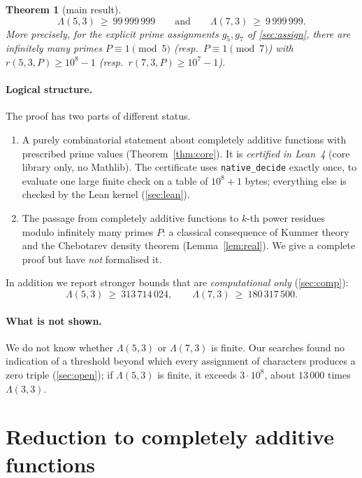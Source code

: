 \documentclass[11pt]{article}
\numberwithin{equation}{section}
\newtheorem{theorem}{Theorem}[section]
\theoremstyle{definition}
\theoremstyle{remark}
\begin{document}
\begin{theorem}[main result]\label{thm:main}
\[
  \Lambda(5,3)\ \ge\ 99\,999\,999 \qquad\text{and}\qquad \Lambda(7,3)\ \ge\ 9\,999\,999 .
\]
More precisely, for the explicit prime assignments $g_5,g_7$ of \cref{sec:assign}, there are infinitely
many primes $P\equiv1\pmod5$ (resp.\ $P\equiv1\pmod7$) with $r(5,3,P)\ge 10^8-1$ (resp.\
$r(7,3,P)\ge10^7-1$).
\end{theorem}

\paragraph{Logical structure.} The proof has two parts of different status.
\begin{enumerate}
\item A purely combinatorial statement about completely additive functions with prescribed prime
values (Theorem~\ref{thm:core}). It is \emph{certified in Lean~4} (core library only, no Mathlib). The
certificate uses \texttt{native\_decide} exactly once, to evaluate one large finite check on a table
of $10^8+1$ bytes; everything else is checked by the Lean kernel (\cref{sec:lean}).
\item The passage from completely additive functions to $k$-th power residues modulo infinitely many
primes $P$: a classical consequence of Kummer theory and the Chebotarev density theorem
(Lemma~\ref{lem:real}). We give a complete proof but have \emph{not} formalised it.
\end{enumerate}
In addition we report stronger bounds that are \emph{computational only} (\cref{sec:comp}):
\[
  \Lambda(5,3)\ \ge\ 313\,714\,024,\qquad \Lambda(7,3)\ \ge\ 180\,317\,500 .
\]

\paragraph{What is not shown.} We do not know whether $\Lambda(5,3)$ or $\Lambda(7,3)$ is finite.
Our searches found no indication of a threshold beyond which every assignment of characters
produces a zero triple (\cref{sec:open}); if $\Lambda(5,3)$ is finite, it exceeds $3\cdot10^8$, about
$13\,000$ times $\Lambda(3,3)$.

\section{Reduction to completely additive functions}\label{sec:reduction}
\end{document}
